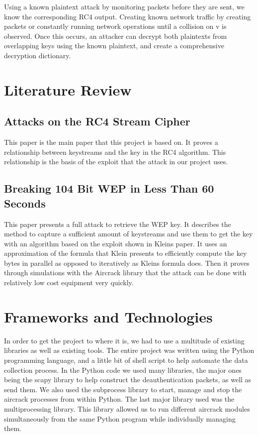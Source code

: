 \documentclass[10pt, titlepage]{article}
\begin{document}
Using a known plaintext attack by monitoring packets before they are sent, we know the corresponding RC4 output. Creating known network traffic by creating packets or constantly running network operations until a collision on v is observed. Once this occurs, an attacker can decrypt both plaintexts from overlapping keys using the known plaintext, and create a comprehensive decryption dictionary. 



\section{Literature Review}
\subsection{Attacks on the RC4 Stream Cipher \cite{klein}}
This paper is the main paper that this project is based on. It proves a relationship between keystreams and the key in the RC4 algorithm. This relationship is the basis of the exploit that the attack in our project uses. 

\subsection{Breaking 104 Bit WEP in Less Than 60 Seconds \cite{mainPaper}}
This paper presents a full attack to retrieve the WEP key. It describes the method to capture a sufficient amount of keystreams and use them to get the key with an algorithm based on the exploit shown in Kleins paper. It uses an approximation of the formula that Klein presents to efficiently compute the key bytes in parallel as opposed to iteratively as Kleins formula does. Then it proves through simulations with the Aircrack library that the attack can be done with relatively low cost equipment very quickly. 

\section{Frameworks and Technologies}
In order to get the project to where it is, we had to use a multitude of existing libraries as well as existing tools. The entire project was written using the Python programming language, and a little bit of shell script to help automate the data collection process. In the Python code we used many libraries, the major ones being the scapy library to help construct the deauthentication packets, as well as send them. We also used the subprocess library to start, manage and stop the aircrack processes from within Python. The last major library used was the multiprocessing library. This library allowed us to run different aircrack modules simultaneously from the same Python program while individually managing them. \\
\end{document}
